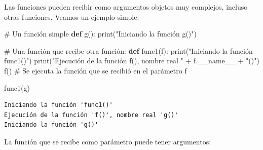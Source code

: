 \documentclass[
  spanish,
  letterpaper,
]{scrbook}
\newenvironment{Shaded}{\begin{snugshade}}{\end{snugshade}}
\newcommand{\BuiltInTok}[1]{\textcolor[rgb]{0.00,0.23,0.31}{#1}}
\newcommand{\CommentTok}[1]{\textcolor[rgb]{0.37,0.37,0.37}{#1}}
\newcommand{\KeywordTok}[1]{\textcolor[rgb]{0.00,0.23,0.31}{\textbf{#1}}}
\newcommand{\NormalTok}[1]{\textcolor[rgb]{0.00,0.23,0.31}{#1}}
\newcommand{\OperatorTok}[1]{\textcolor[rgb]{0.37,0.37,0.37}{#1}}
\newcommand{\StringTok}[1]{\textcolor[rgb]{0.13,0.47,0.30}{#1}}
\newcommand{\VariableTok}[1]{\textcolor[rgb]{0.07,0.07,0.07}{#1}}
\theoremstyle{definition}
\theoremstyle{remark}
\begin{document}
Las funciones pueden recibir como argumentos objetos muy complejos,
incluso otras funciones. Veamos un ejemplo simple:

\begin{Shaded}
\begin{Highlighting}[]
\CommentTok{\# Un función simple}
\KeywordTok{def}\NormalTok{ g():}
    \BuiltInTok{print}\NormalTok{(}\StringTok{"Iniciando la función \textquotesingle{}g()\textquotesingle{}"}\NormalTok{)}

\CommentTok{\# Una función que recibe otra función:}
\KeywordTok{def}\NormalTok{ func1(f):}
    \BuiltInTok{print}\NormalTok{(}\StringTok{"Iniciando la función \textquotesingle{}func1()\textquotesingle{}"}\NormalTok{)}
    \BuiltInTok{print}\NormalTok{(}\StringTok{"Ejecución de la función \textquotesingle{}f()\textquotesingle{}, nombre real \textquotesingle{}"} \OperatorTok{+}\NormalTok{ f.}\VariableTok{\_\_name\_\_} \OperatorTok{+} \StringTok{"()\textquotesingle{}"}\NormalTok{)}
\NormalTok{    f() }\CommentTok{\# Se ejecuta la función que se recibió en el parámetro f}
\end{Highlighting}
\end{Shaded}

\begin{Shaded}
\begin{Highlighting}[]
\NormalTok{func1(g)}
\end{Highlighting}
\end{Shaded}

\begin{verbatim}
Iniciando la función 'func1()'
Ejecución de la función 'f()', nombre real 'g()'
Iniciando la función 'g()'
\end{verbatim}

La función que se recibe como parámetro puede tener argumentos:
\end{document}
